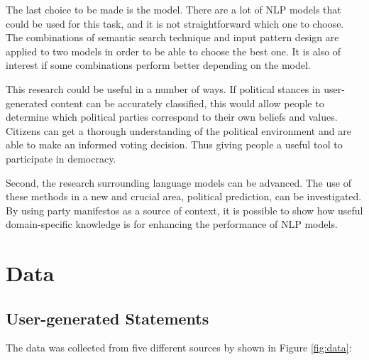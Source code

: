 The last choice to be made is the model. There are a lot of NLP models that could be used for this task, and it is not straightforward which one to choose. The combinations of semantic search technique and input pattern design are applied to two models in order to be able to choose the best one. It is also of interest if some combinations perform better depending on the model.

This research could be useful in a number of ways. If political stances in user-generated content can be accurately classified, this would allow people to determine which political parties correspond to their own beliefs and values. Citizens can get a thorough understanding of the political environment and are able to make an informed voting decision. Thus giving people a useful tool to participate in democracy.

Second, the research surrounding language models can be advanced. The use of these methods in a new and crucial area, political prediction, can be investigated. By using party manifestos as a source of context, it is possible to show how useful domain-specific knowledge is for enhancing the performance of NLP models.

\section{Data} \label{data}

\subsection{User-generated Statements}

The data was collected from five different sources by \citet{witte_2022} shown in Figure \ref{fig:data}:

